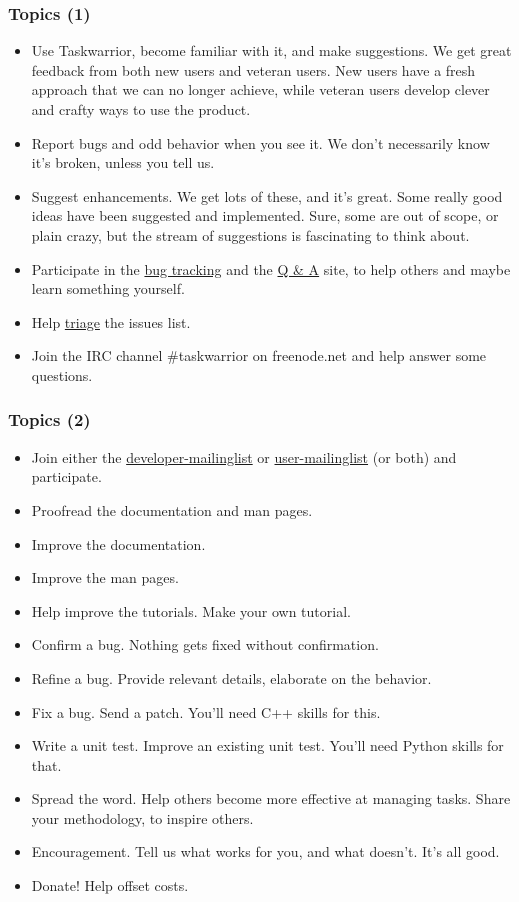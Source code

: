 \documentclass[t,handout]{beamer}
\begin{document}
\begin{frame}[fragile]\frametitle{Topics (1)}
    \begin{itemize}
        \item Use Taskwarrior, become familiar with it, and make suggestions. We get great feedback from both new users and veteran users. New users have a fresh approach that we can no longer achieve, while veteran users develop clever and crafty ways to use the product.
        \item Report bugs and odd behavior when you see it. We don't necessarily know it's broken, unless you tell us.
        \item Suggest enhancements. We get lots of these, and it's great. Some really good ideas have been suggested and implemented. Sure, some are out of scope, or plain crazy, but the stream of suggestions is fascinating to think about.
        \item Participate in the \href{https://bug.tasktools.org}{bug tracking} and the \href{https://answers.tasktools.org}{Q \& A} site, to help others and maybe learn something yourself.
        \item Help \href{https://taskwarrior.org/docs/triage.html}{triage} the issues list.
        \item Join the IRC channel \#taskwarrior on freenode.net and help answer some questions.
    \end{itemize}
\end{frame}

\begin{frame}[fragile]\frametitle{Topics (2)}
    \begin{itemize}
        \item Join either the \href{https://groups.google.com/forum/#!forum/taskwarrior-dev}{developer-mailinglist} or \href{https://groups.google.com/forum/#!forum/taskwarrior-user}{user-mailinglist} (or both) and participate.
        \item Proofread the documentation and man pages.
        \item Improve the documentation.
        \item Improve the man pages.
        \item Help improve the tutorials. Make your own tutorial.
        \item Confirm a bug. Nothing gets fixed without confirmation.
        \item Refine a bug. Provide relevant details, elaborate on the behavior.
        \item Fix a bug. Send a patch. You'll need C++ skills for this.
        \item Write a unit test. Improve an existing unit test. You'll need Python skills for that.
        \item Spread the word. Help others become more effective at managing tasks. Share your methodology, to inspire others.
        \item Encouragement. Tell us what works for you, and what doesn't. It's all good.
        \item Donate! Help offset costs.
    \end{itemize}
\end{frame}
\end{document}
